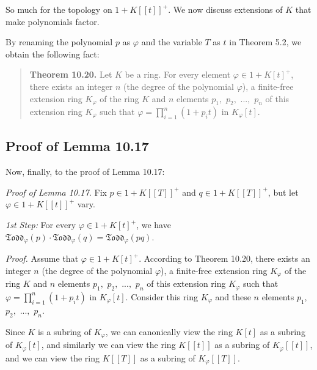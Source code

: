 \documentclass[numbers=enddot,12pt,final,onecolumn,notitlepage]{scrartcl}%
\begin{document}
So much for the topology on $1+K\left[  \left[  t\right]  \right]  ^{+}$. We
now discuss extensions of $K$ that make polynomials factor.

By renaming the polynomial $p$ as $\varphi$ and the variable $T$ as $t$ in
Theorem 5.2, we obtain the following fact:

\begin{quote}
\textbf{Theorem 10.20.} Let $K$ be a ring. For every element $\varphi
\in1+K\left[  t\right]  ^{+}$, there exists an integer $n$ (the degree of the
polynomial $\varphi$), a finite-free extension ring $K_{\varphi}$ of the ring
$K$ and $n$ elements $p_{1},$ $p_{2},$ $...,$ $p_{n}$ of this extension ring
$K_{\varphi}$ such that $\varphi=\prod\limits_{i=1}^{n}\left(  1+p_{i}%
t\right)  $ in $K_{\varphi}\left[  t\right]  $.
\end{quote}

\subsection{Proof of Lemma 10.17}

Now, finally, to the proof of Lemma 10.17:

\textit{Proof of Lemma 10.17.} Fix $p\in1+K\left[  \left[  T\right]  \right]
^{+}$ and $q\in1+K\left[  \left[  T\right]  \right]  ^{+}$, but let
$\varphi\in1+K\left[  \left[  t\right]  \right]  ^{+}$ vary.

\textit{1st Step:} For every $\varphi\in1+K\left[  t\right]  ^{+}$, we have
$\mathfrak{Todd}_{\varphi}\left(  p\right)  \cdot\mathfrak{Todd}_{\varphi
}\left(  q\right)  =\mathfrak{Todd}_{\varphi}\left(  pq\right)  $.

\textit{Proof.} Assume that $\varphi\in1+K\left[  t\right]  ^{+}$. According
to Theorem 10.20, there exists an integer $n$ (the degree of the polynomial
$\varphi$), a finite-free extension ring $K_{\varphi}$ of the ring $K$ and $n$
elements $p_{1},$ $p_{2},$ $...,$ $p_{n}$ of this extension ring $K_{\varphi}$
such that $\varphi=\prod\limits_{i=1}^{n}\left(  1+p_{i}t\right)  $ in
$K_{\varphi}\left[  t\right]  $. Consider this ring $K_{\varphi}$ and these
$n$ elements $p_{1},$ $p_{2},$ $...,$ $p_{n}$.

Since $K$ is a subring of $K_{\varphi}$, we can canonically view the ring
$K\left[  t\right]  $ as a subring of $K_{\varphi}\left[  t\right]  $, and
similarly we can view the ring $K\left[  \left[  t\right]  \right]  $ as a
subring of $K_{\varphi}\left[  \left[  t\right]  \right]  $, and we can view
the ring $K\left[  \left[  T\right]  \right]  $ as a subring of $K_{\varphi
}\left[  \left[  T\right]  \right]  $.
\end{document}
